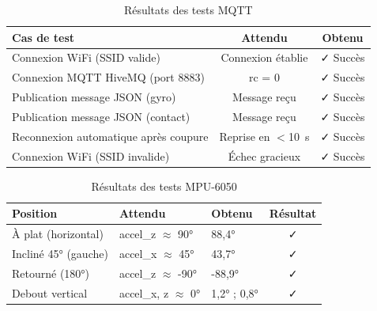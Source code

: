 \documentclass[12pt, a4paper]{report}
\begin{document}
\begin{table}[H]
  \centering
  \caption{Résultats des tests MQTT}
  \label{tab:test_mqtt}
  \renewcommand{\arraystretch}{1.4}
  \small
  \begin{tabularx}{\textwidth}{|X|c|c|}
    \hline
    \rowcolor{isimablue!20}
    \textbf{Cas de test} & \textbf{Attendu} & \textbf{Obtenu} \\
    \hline
    Connexion WiFi (SSID valide) & Connexion établie & \textcolor{green!60!black}{✓ Succès} \\
    \hline
    Connexion MQTT HiveMQ (port 8883) & rc = 0 & \textcolor{green!60!black}{✓ Succès} \\
    \hline
    Publication message JSON (gyro) & Message reçu & \textcolor{green!60!black}{✓ Succès} \\
    \hline
    Publication message JSON (contact) & Message reçu & \textcolor{green!60!black}{✓ Succès} \\
    \hline
    Reconnexion automatique après coupure & Reprise en $<$10~s & \textcolor{green!60!black}{✓ Succès} \\
    \hline
    Connexion WiFi (SSID invalide) & Échec gracieux & \textcolor{green!60!black}{✓ Succès} \\
    \hline
  \end{tabularx}
\end{table}

\begin{table}[H]
  \centering
  \caption{Résultats des tests MPU-6050}
  \label{tab:test_mpu}
  \renewcommand{\arraystretch}{1.4}
  \small
  \begin{tabularx}{\textwidth}{|p{3.5cm}|p{3cm}|p{3cm}|c|}
    \hline
    \rowcolor{isimablue!20}
    \textbf{Position} & \textbf{Attendu} & \textbf{Obtenu} & \textbf{Résultat} \\
    \hline
    À plat (horizontal) & accel\_z $\approx$ 90° & 88,4° & \textcolor{green!60!black}{✓} \\
    \hline
    Incliné 45° (gauche) & accel\_x $\approx$ 45° & 43,7° & \textcolor{green!60!black}{✓} \\
    \hline
    Retourné (180°) & accel\_z $\approx$ -90° & -88,9° & \textcolor{green!60!black}{✓} \\
    \hline
    Debout vertical & accel\_x, z $\approx$ 0° & 1,2° ; 0,8° & \textcolor{green!60!black}{✓} \\
    \hline
  \end{tabularx}
\end{table}
\end{document}
